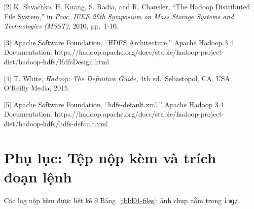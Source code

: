 \documentclass[
  12pt,
  a4paper,
]{report}
\begin{document}
{[}2{]} K. Shvachko, H. Kuang, S. Radia, and R. Chansler, ``The Hadoop
Distributed File System,'' in \emph{Proc. IEEE 26th Symposium on Mass
Storage Systems and Technologies (MSST)}, 2010, pp.~1-10.

{[}3{]} Apache Software Foundation, ``HDFS Architecture,'' Apache Hadoop
3.4 Documentation.
https://hadoop.apache.org/docs/stable/hadoop-project-dist/hadoop-hdfs/HdfsDesign.html

{[}4{]} T. White, \emph{Hadoop: The Definitive Guide}, 4th
ed.~Sebastopol, CA, USA: O'Reilly Media, 2015.

{[}5{]} Apache Software Foundation, ``hdfs-default.xml,'' Apache Hadoop
3.4 Documentation.
https://hadoop.apache.org/docs/stable/hadoop-project-dist/hadoop-hdfs/hdfs-default.xml

\section*{Phụ lục: Tệp nộp kèm và trích đoạn
lệnh}\label{phux1ee5-lux1ee5c-tux1ec7p-nux1ed9p-kuxe8m-vuxe0-truxedch-ux111oux1ea1n-lux1ec7nh}

Các log nộp kèm được liệt kê ở Bảng~\ref{tbl:l01-files}; ảnh chụp nằm
trong \texttt{img/}.
\end{document}
